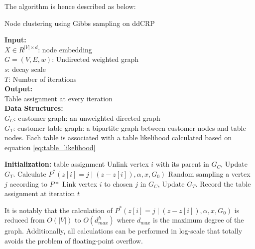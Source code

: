 The algorithm is hence described as below:

\begin{algorithm}[H]
\caption{Node clustering using Gibbs sampling on ddCRP}
\textbf{Input:}\\
    $X \in R^{|V| \times d}$: node embedding\\
    $G = (V, E, w)$: Undirected weighted graph\\
    $s$: decay scale\\
    $T$: Number of iterations\\

\textbf{Output:}\\
    Table assignment at every iteration\\

\textbf{Data Structures:} \\
    $G_C$: customer graph: an unweighted directed graph \\
    $G_T$: customer-table graph: a bipartite graph between customer nodes and table nodes. Each table is associated with a table likelihood calculated based on equation \ref{eq:table_likelihood}\\


\begin{algorithmic}
\State \textbf{Initialization:} table assignment
        \State Unlink vertex $i$ with its parent in $G_C$, Update $G_T$.
        \State Calculate $P^*(z[i] = j \;|\; (z - z[i]), \alpha, x, G_0)$
        \State Random sampling a vertex $j$ according to $P*$
        \State Link vertex $i$ to chosen $j$ in $G_C$, Update $G_T$.
    \EndFor
    \State Record the table assignment at iteration $t$
\EndFor
\end{algorithmic}
\end{algorithm}

It is notably that the calculation of $P^*(z[i] = j \;|\; (z - z[i]), \alpha, x, G_0)$ is reduced from $O(|V|)$ to $O(d_{max}^h)$ where $d_{max}$ is the maximum degree of the graph. Additionally, all calculations can be performed in log-scale that totally avoids the problem of floating-point overflow.

